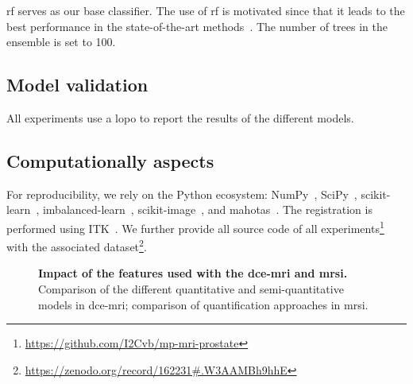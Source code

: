 \documentclass[final,3p,times,twocolumn]{elsarticle}
\begin{document}
\ac{rf} serves as our base classifier. The use of \ac{rf} is motivated since
that it leads to the best performance in the state-of-the-art
methods~\cite{Litjens2014,lemaitre2015computer}. The number of trees in
the ensemble is set to 100.

\subsection{Model validation}

All experiments use a \ac{lopo} to report the results of the different models.

\subsection{Computationally aspects}

For reproducibility, we rely on the Python ecosystem:
NumPy~\cite{walt2011numpy}, SciPy~\cite{jones2014scipy},
scikit-learn~\cite{pedregosa2011scikit},
imbalanced-learn~\cite{lemaitre2017imbalanced},
scikit-image~\cite{van2014scikit},
and mahotas~\cite{coelho2012mahotas}. The registration is performed using
ITK~\cite{ibanez2005itk}. We further provide all source code of all
experiments\footnote{\url{https://github.com/I2Cvb/mp-mri-prostate}} with the
associated
dataset\footnote{\url{https://zenodo.org/record/162231#.W3AAMBh9hhE}}.

\begin{figure}
  \hspace*{\fill}
  \hfill
  \hspace*{\fill}
  \caption[]{\textbf{Impact of the features used with the \ac{dce}-\ac{mri} and
    \ac{mrsi}.} \protect{} Comparison of the different
  quantitative and semi-quantitative models in \ac{dce}-\ac{mri};
  \protect{} comparison of quantification approaches in
  \ac{mrsi}.}
  \label{fig:dce_results}
\end{figure}
\end{document}

